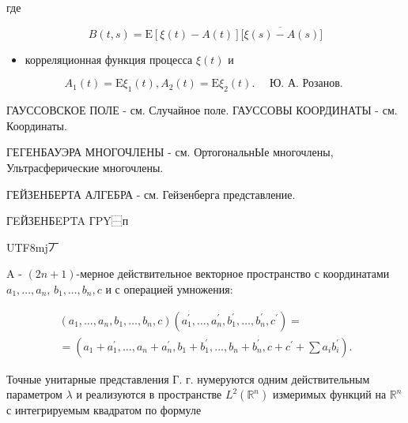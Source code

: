 \documentclass[10pt]{article}
\begin{document}
где



\[

B(t, s)=\mathrm{E}[\xi(t)-A(t)] \overline{[\xi(s)-A(s)}]

\]



\begin{itemize}

  \item корреляционная функция процесса $\xi(t)$ и

\end{itemize}



\[

A_{1}(t)=\mathrm{E} \xi_{1}(t), A_{2}(t)=\mathrm{E} \xi_{2}(t) . \quad \text { Ю. А. Розанов. }

\]



ГАУССОВСКОЕ ПОЛЕ - см. Случайное поле. ГАУССОВЫ КООРДИНАТЫ - см. Координаты.



ГЕГЕНБАУЭРА МНОГОЧЛЕНЫ - см. ОртогональнЫе многочлены, Ультрасферические многочлены.



ГЕЙЗЕНБЕРТА АЛГЕБРА - см. Гейзенберга представление.



ГEЙЗЕНБEPTA ГPY⿱п\begin{CJK}{UTF8}{mj}丆\end{CJK}A - $(2 n+1)$-мерное действительное векторное пространство с координатами $a_{1}, \ldots, a_{n}$, $b_{1}, \ldots, b_{n}, c$ и с операцией умножения:



\[

\begin{gathered}

\left(a_{1}, \ldots, a_{n}, b_{1}, \ldots, b_{n}, c\right)\left(a_{1}^{\prime}, \ldots, a_{n}^{\prime}, b_{1}^{\prime}, \ldots, b_{n}^{\prime}, c^{\prime}\right)= \\

=\left(a_{1}+a_{1}^{\prime}, \ldots, a_{n}+a_{n}^{\prime}, b_{1}+b_{1}^{\prime}, \ldots, b_{n}+b_{n}^{\prime}, c+c^{\prime}+\sum a_{i} b_{i}^{\prime}\right) .

\end{gathered}

\]



Точные унитарные представления Г. г. нумеруются одним действительным параметром $\lambda$ и реализуются в пространстве $L^{2}\left(\mathbb{R}^{n}\right)$ измеримых функций на $\mathbb{R}^{n}$ с интегрируемым квадратом по формуле
\end{document}
